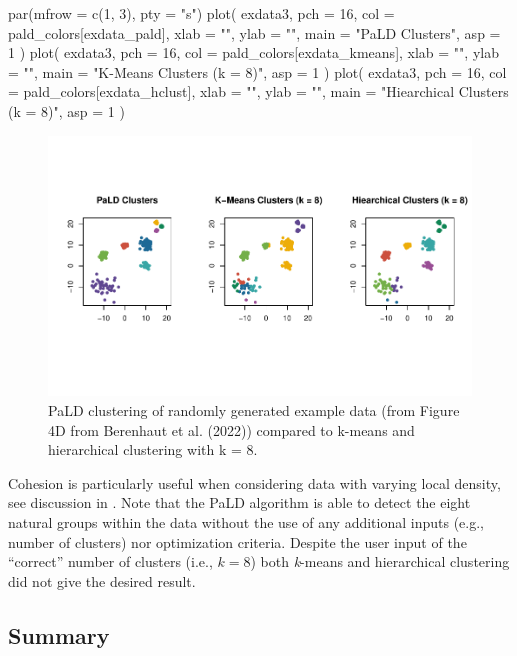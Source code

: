 \begin{Schunk}
\begin{Sinput}
par(mfrow = c(1, 3), pty = "s")
plot(
  exdata3,
  pch = 16,
  col = pald_colors[exdata_pald],
  xlab = "",
  ylab = "",
  main = "PaLD Clusters",
  asp = 1
)
plot(
  exdata3,
  pch = 16,
  col = pald_colors[exdata_kmeans],
  xlab = "",
  ylab = "",
  main = "K-Means Clusters (k = 8)",
  asp = 1
)
plot(
  exdata3,
  pch = 16,
  col = pald_colors[exdata_hclust],
  xlab = "",
  ylab = "",
  main = "Hiearchical Clusters (k = 8)",
  asp = 1
)
\end{Sinput}
\begin{figure}
\includegraphics{dagostino-mcgowan_files/figure-latex/fig5-1} \caption[PaLD clustering of randomly generated example data (from Figure 4D from Berenhaut et al]{PaLD clustering of randomly generated example data (from Figure 4D from Berenhaut et al. (2022)) compared to k-means and hierarchical clustering with k = 8.}\label{fig:fig5}
\end{figure}
\end{Schunk}

Cohesion is particularly useful when considering data with varying local
density, see discussion in \citet{berenhaut2022social}. Note that the
PaLD algorithm is able to detect the eight natural groups within the
data without the use of any additional inputs (e.g., number of clusters)
nor optimization criteria. Despite the user input of the ``correct''
number of clusters (i.e., \(k = 8\)) both \emph{k}-means and
hierarchical clustering did not give the desired result.

\hypertarget{summary}{%
\subsection{Summary}\label{summary}}

